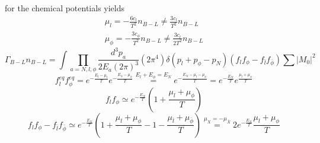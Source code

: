 for the chemical potentials yields
\begin{align*}
	\mu_l=-\frac{6c_l}{T^2}n_{B-L}\neq\frac{3c_l}{T^2}n_{B-L}\\
	\mu_\phi=-\frac{3c_\phi}{T^2}n_{B-L}\neq\frac{3c_l}{2T^2}n_{B-L}
\end{align*}
\newpage
\begin{equation*}
	\Gamma_{B-L}n_{B-L}=\int\prod_{a=N,l,\phi}\frac{d^3p_a}{2E_a(2\pi)^3}(2\pi^4)\delta(p_l+p_\phi-p_N)(	f_lf_\phi-f_{\bar{l}}f_{\bar{\phi}})\sum|M_0|^2
\end{equation*}
\newline
\begin{equation*}
	f_l^{eq}f_\phi^{eq}=e^{-\frac{E_l-\mu_l}{T}}e^{-\frac{E_\phi-\mu_\phi}{T}}\overset{E_l+E_\phi=E_N}{=}e^{-\frac{E_N-\mu_l-\mu_\phi}{T}}=e^{-\frac{E_N}{T}}e^{\frac{\mu_l+\mu_\phi}{T}}
\end{equation*}
\begin{equation*}
	f_lf_\phi\simeq e^{-\frac{E_N}{T}}\left(1+\frac{\mu_l+\mu_\phi}{T}\right)
\end{equation*}
\begin{equation*}
	f_lf_\phi-f_{\bar{l}}f_{\bar{\phi}}\simeq e^{-\frac{E_N}{T}}\left(1+\frac{\mu_l+\mu_\phi}{T}-1-\frac{\mu_{\bar{l}}+\mu_{\bar{\phi}}}{T}\right)\overset{\mu_X=-\mu_{\bar{X}}}{=}2e^{-\frac{E_N}{T}}\frac{\mu_l+\mu_\phi}{T}
\end{equation*}

\newpage